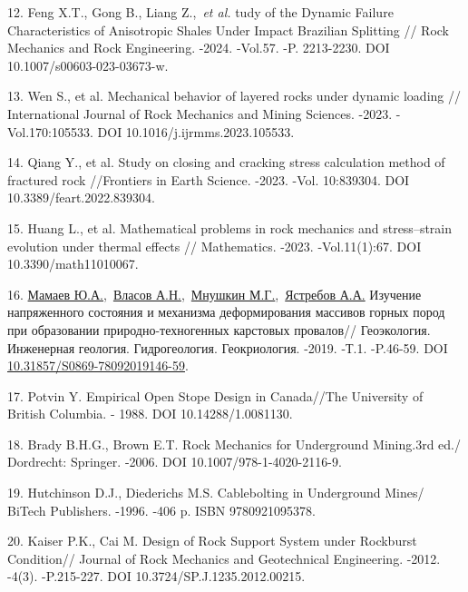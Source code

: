 \begin{refs}
12. Feng X.T., Gong B., Liang Z.,~\emph{et al.} tudy of the Dynamic
Failure Characteristics of Anisotropic Shales Under Impact Brazilian
Splitting // Rock Mechanics and Rock Engineering. -2024. -Vol.57. -P.
2213-2230. DOI 10.1007/s00603-023-03673-w.

13. Wen S., et al. Mechanical behavior of layered rocks under dynamic
loading // International Journal of Rock Mechanics and Mining Sciences.
-2023. -Vol.170:105533. DOI 10.1016/j.ijrmms.2023.105533.

14. Qiang Y., et al. Study on closing and cracking stress calculation
method of fractured rock //Frontiers in Earth Science. -2023. -Vol.
10:839304. DOI 10.3389/feart.2022.839304.

15. Huang L., et al. Mathematical problems in rock mechanics and
stress--strain evolution under thermal effects // Mathematics. -2023.
-Vol.11(1):67. DOI 10.3390/math11010067.

16. \href{https://journals.eco-vector.com/0869-7809/search/authors/view?firstName=\%D0\%AE.&middleName=\%D0\%90.&lastName=\%D0\%9C\%D0\%B0\%D0\%BC\%D0\%B0\%D0\%B5\%D0\%B2}{Мамаев
Ю.А.},~\href{https://journals.eco-vector.com/0869-7809/search/authors/view?firstName=\%D0\%90.&middleName=\%D0\%9D.&lastName=\%D0\%92\%D0\%BB\%D0\%B0\%D1\%81\%D0\%BE\%D0\%B2}{Власов
А.Н.},~\href{https://journals.eco-vector.com/0869-7809/search/authors/view?firstName=\%D0\%9C.&middleName=\%D0\%93.&lastName=\%D0\%9C\%D0\%BD\%D1\%83\%D1\%88\%D0\%BA\%D0\%B8\%D0\%BD}{Мнушкин
М.Г.},~\href{https://journals.eco-vector.com/0869-7809/search/authors/view?firstName=\%D0\%90.&middleName=\%D0\%90.&lastName=\%D0\%AF\%D1\%81\%D1\%82\%D1\%80\%D0\%B5\%D0\%B1\%D0\%BE\%D0\%B2}{Ястребов
А.А.} Изучение напряженного состояния и механизма деформирования
массивов горных пород при образовании природно-техногенных карстовых
провалов// Геоэкология. Инженерная геология. Гидрогеология.
Геокриология. -2019. -Т.1. -P.46-59. DOI
\href{https://doi.org/10.31857/S0869-78092019146-59}{10.31857/S0869-78092019146-59}.

17. Potvin Y. Empirical Open Stope Design in Canada//The University of
British Columbia. - 1988. DOI 10.14288/1.0081130.

18. Brady B.H.G., Brown E.T. Rock Mechanics for Underground Mining.3rd
ed./ Dordrecht: Springer. -2006. DOI 10.1007/978-1-4020-2116-9.

19. Hutchinson D.J., Diederichs M.S. Cablebolting in Underground Mines/
BiTech Publishers. -1996. -406 p. ISBN 9780921095378.

20. Kaiser P.K., Cai M. Design of Rock Support System under Rockburst
Condition// Journal of Rock Mechanics and Geotechnical Engineering.
-2012. -4(3). -P.215-227. DOI 10.3724/SP.J.1235.2012.00215.


\end{refs}
